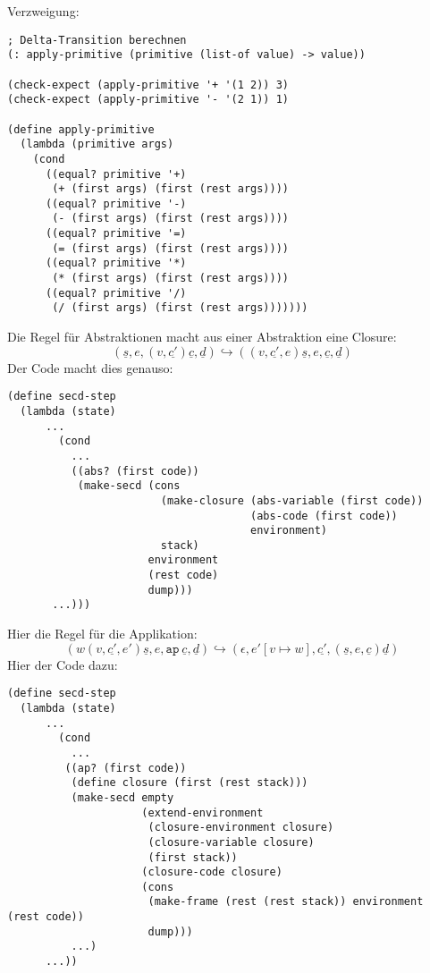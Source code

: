 Verzweigung:
%
\begin{lstlisting}
; Delta-Transition berechnen
(: apply-primitive (primitive (list-of value) -> value))

(check-expect (apply-primitive '+ '(1 2)) 3)
(check-expect (apply-primitive '- '(2 1)) 1)

(define apply-primitive
  (lambda (primitive args)
    (cond
      ((equal? primitive '+)
       (+ (first args) (first (rest args))))
      ((equal? primitive '-)
       (- (first args) (first (rest args))))
      ((equal? primitive '=)
       (= (first args) (first (rest args))))
      ((equal? primitive '*)
       (* (first args) (first (rest args))))
      ((equal? primitive '/)
       (/ (first args) (first (rest args)))))))
\end{lstlisting}
%
Die Regel für Abstraktionen macht aus einer Abstraktion eine Closure:
\begin{displaymath}
  (\underline{s}, e, (v, \underline{c'}) \underline{c}, \underline{d})
  \hookrightarrow
  ((v, \underline{c'}, e) \underline{s}, e, \underline{c}, \underline{d})
\end{displaymath}
%
Der Code macht dies genauso:
%
\begin{lstlisting}
(define secd-step
  (lambda (state)
      ...
        (cond
          ...
          ((abs? (first code))
           (make-secd (cons
                        (make-closure (abs-variable (first code))
                                      (abs-code (first code))
                                      environment)
                        stack)
                      environment
                      (rest code)
                      dump)))
       ...)))
\end{lstlisting}
%
Hier die Regel für die Applikation:
%
\begin{displaymath}
  (w (v,\underline{c'}, e') \underline{s}, e, \mathtt{ap}~\underline{c}, \underline{d})
  \hookrightarrow
  (\epsilon, e'[v\mapsto w], \underline{c'}, (\underline{s}, e, \underline{c}) \underline{d})
\end{displaymath}
%
Hier der Code dazu:
%
\begin{lstlisting}
(define secd-step
  (lambda (state)
      ...
        (cond
          ...
         ((ap? (first code))
          (define closure (first (rest stack)))
          (make-secd empty  
                     (extend-environment
                      (closure-environment closure)
                      (closure-variable closure)
                      (first stack))
                     (closure-code closure)
                     (cons
                      (make-frame (rest (rest stack)) environment (rest code))
                      dump)))
          ...)
      ...))
\end{lstlisting}
